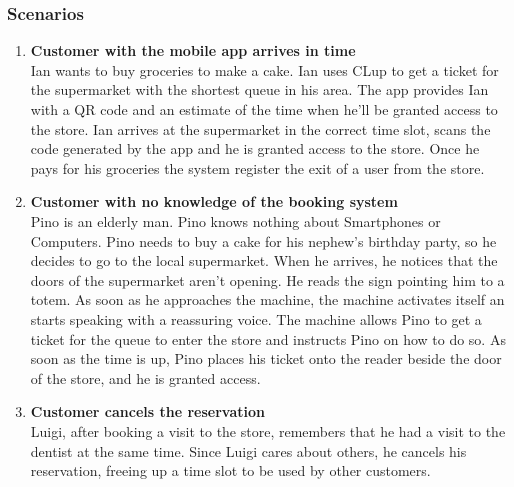 \subsubsection{Scenarios}
    \begin{enumerate}[label=\Alph*.]
        \item \textbf{Customer with the mobile app arrives in time}\\
            Ian wants to buy groceries to make a cake. Ian uses CLup to get a ticket for the supermarket with the shortest queue in his area.
            The app provides Ian with a QR code and an estimate of the time when he'll be granted access to the store. 
            Ian arrives at the supermarket in the correct time slot, scans the code generated by the app and he is granted access to the store. Once he pays for his groceries the system register the exit of a user from the store. 

        \item \textbf{Customer with no knowledge of the booking system}\\
            Pino is an elderly man. Pino knows nothing about Smartphones or Computers. Pino needs to buy a cake for his
            nephew's birthday party, so he decides to go to the local supermarket. When he arrives, he notices that the doors of the supermarket
            aren't opening. He reads the sign pointing him to a totem. 
            As soon as he approaches the machine, the machine activates itself an starts speaking with a reassuring voice. 
            The machine allows Pino to get a ticket for the queue to enter the store and instructs Pino on how to do so. 
            As soon as the time is up, Pino places his ticket onto the reader beside the door of the store, and he is granted access. 

        \item \textbf{Customer cancels the reservation}\\
            Luigi, after booking a visit to the store, remembers that he had a visit to the dentist at the same time.
            Since Luigi cares about others, he cancels his reservation, freeing up a time slot to be used by other customers.


\end{enumerate}
